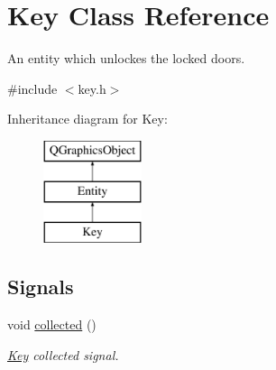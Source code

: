 \hypertarget{class_key}{}\section{Key Class Reference}
\label{class_key}


An entity which unlockes the locked doors.  




{\ttfamily \#include $<$key.\+h$>$}

Inheritance diagram for Key\+:\begin{figure}[H]
\begin{center}
\leavevmode
\includegraphics[height=3.000000cm]{class_key}
\end{center}
\end{figure}
\subsection*{Signals}
\begin{DoxyCompactItemize}
\item 
\mbox{\label{class_key_a2e8f9391439ce349a3b5f0deec070ddf}} 
void \hyperlink{class_key_a2e8f9391439ce349a3b5f0deec070ddf}{collected} ()
\begin{DoxyCompactList}\small\item\em \hyperlink{class_key}{Key} collected signal. \end{DoxyCompactList}\end{DoxyCompactItemize}
